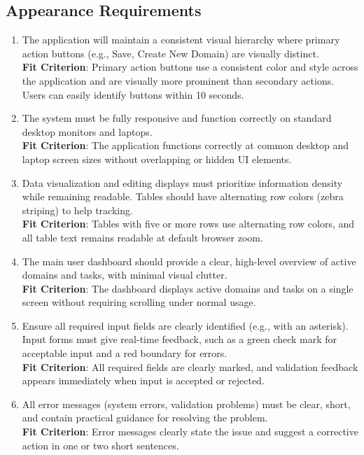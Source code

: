 \documentclass[12pt]{article}
\begin{document}
\subsection{Appearance Requirements}
\begin{enumerate}[label=LF-AR\arabic*]
  \item The application will maintain a consistent visual hierarchy where primary action buttons (e.g., Save, Create New Domain) are visually distinct.
  \\ \textbf{Fit Criterion}: Primary action buttons use a consistent color and style across the application and are visually more prominent than secondary actions. Users can easily identify buttons within 10 seconds.
  \item The system must be fully responsive and function correctly on standard desktop monitors and laptops.
  \\ \textbf{Fit Criterion}: The application functions correctly at common desktop and laptop screen sizes without overlapping or hidden UI elements.
  \item Data visualization and editing displays must prioritize information density while remaining readable. Tables should have alternating row colors (zebra striping) to help tracking.
  \\ \textbf{Fit Criterion}: Tables with five or more rows use alternating row colors, and all table text remains readable at default browser zoom.
  \item The main user dashboard should provide a clear, high-level overview of active domains and tasks, with minimal visual clutter.
  \\ \textbf{Fit Criterion}: The dashboard displays active domains and tasks on a single screen without requiring scrolling under normal usage.
  \item Ensure all required input fields are clearly identified (e.g., with an asterisk). Input forms must give real-time feedback, such as a green check mark for acceptable input and a red boundary for errors.
  \\ \textbf{Fit Criterion}: All required fields are clearly marked, and validation feedback appears immediately when input is accepted or rejected.
  \item All error messages (system errors, validation problems) must be clear, short, and contain practical guidance for resolving the problem.
  \\ \textbf{Fit Criterion}: Error messages clearly state the issue and suggest a corrective action in one or two short sentences.
\end{enumerate}
\end{document}
